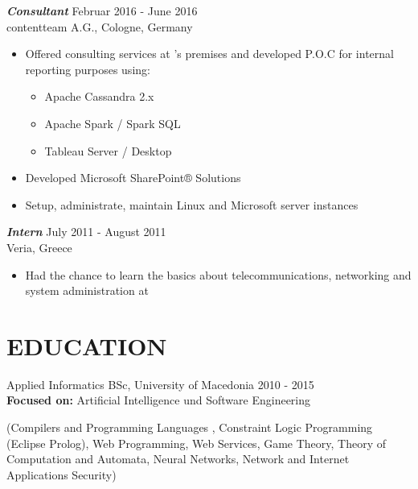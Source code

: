 \documentclass[margin, 10pt]{res} %
\begin{document}
\begin{resume}
{\sl \textbf{Consultant} } \hfill Februar 2016 - June 2016 \\
contentteam A.G., Cologne, Germany \hfill {} \\
\begin{itemize}
\item Offered consulting services at 's premises and developed P.O.C for internal reporting purposes using: 
\begin{itemize}
\item Apache Cassandra 2.x
\item Apache Spark / Spark SQL
\item Tableau Server / Desktop 
\end{itemize}
\item Developed Microsoft SharePoint® Solutions
\item Setup, administrate, maintain Linux and Microsoft server instances
\end{itemize} 

{\sl \textbf{Intern} } \hfill July 2011 - August 2011 \\
Veria, Greece  \hfill {} \\
\begin{itemize} \itemsep -2pt %
\item Had the chance to learn the basics about telecommunications, networking and system administration at \texttt{}

\end{itemize}
 



\section{EDUCATION}

Applied Informatics BSc, University of Macedonia \hfill 2010 - 2015 \\
\textbf{Focused on:} Artificial Intelligence und Software Engineering

\small{(Compilers and Programming Languages , Constraint Logic Programming (Eclipse Prolog), Web Programming, Web Services, Game Theory, Theory of Computation and Automata, Neural Networks, Network and Internet Applications Security)}


\end{resume}
\end{document}

